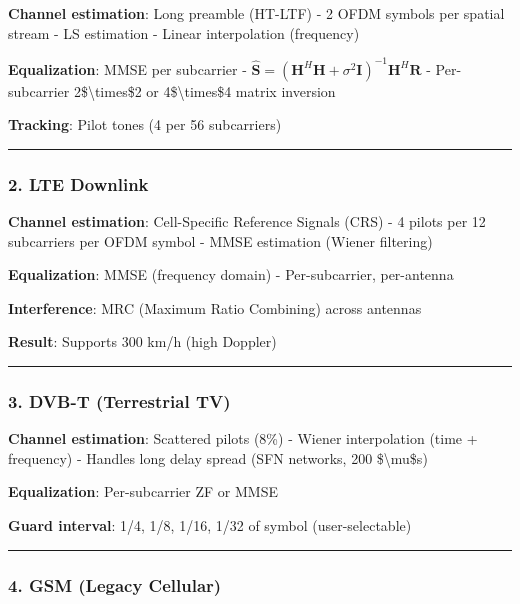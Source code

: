 \textbf{Channel estimation}: Long preamble (HT-LTF) - 2 OFDM symbols per
spatial stream - LS estimation - Linear interpolation (frequency)

\textbf{Equalization}: MMSE per subcarrier -
\(\hat{\mathbf{S}} = (\mathbf{H}^H \mathbf{H} + \sigma^2 \mathbf{I})^{-1} \mathbf{H}^H \mathbf{R}\)
- Per-subcarrier 2\$\textbackslash times\$2 or
4\$\textbackslash times\$4 matrix inversion

\textbf{Tracking}: Pilot tones (4 per 56 subcarriers)

\begin{center}\rule{0.5\linewidth}{0.5pt}\end{center}

\subsubsection{2. LTE Downlink}\label{lte-downlink}

\textbf{Channel estimation}: Cell-Specific Reference Signals (CRS) - 4
pilots per 12 subcarriers per OFDM symbol - MMSE estimation (Wiener
filtering)

\textbf{Equalization}: MMSE (frequency domain) - Per-subcarrier,
per-antenna

\textbf{Interference}: MRC (Maximum Ratio Combining) across antennas

\textbf{Result}: Supports 300 km/h (high Doppler)

\begin{center}\rule{0.5\linewidth}{0.5pt}\end{center}

\subsubsection{3. DVB-T (Terrestrial TV)}\label{dvb-t-terrestrial-tv}

\textbf{Channel estimation}: Scattered pilots (8\%) - Wiener
interpolation (time + frequency) - Handles long delay spread (SFN
networks, 200 \$\textbackslash mu\$s)

\textbf{Equalization}: Per-subcarrier ZF or MMSE

\textbf{Guard interval}: 1/4, 1/8, 1/16, 1/32 of symbol
(user-selectable)

\begin{center}\rule{0.5\linewidth}{0.5pt}\end{center}

\subsubsection{4. GSM (Legacy Cellular)}\label{gsm-legacy-cellular}

